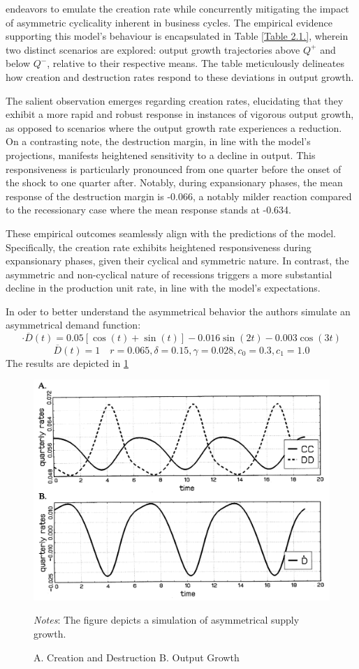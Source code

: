 \documentclass[12pt]{article}
\begin{document}
endeavors to emulate the creation rate while concurrently mitigating the impact of asymmetric cyclicality inherent in
business cycles. The empirical evidence supporting this model's behaviour is encapsulated in Table \ref{Table 2.1.},
wherein two distinct scenarios are explored: output growth trajectories above \(Q^+\) and below \(Q^-\), relative to
their respective means. The table meticulously delineates how creation and destruction rates respond to these deviations
in output growth. 
\par
The salient observation emerges regarding creation rates, elucidating that they exhibit a more rapid and robust response
in instances of vigorous output growth, as opposed to scenarios where the output growth rate experiences a reduction. On
a contrasting note, the destruction margin, in line with the model's projections, manifests heightened sensitivity to a
decline in output. This responsiveness is particularly pronounced from one quarter before the onset of the shock to one
quarter after. Notably, during expansionary phases, the mean response of the destruction margin is -0.066, a notably
milder reaction compared to the recessionary case where the mean response stands at -0.634. 
\par
These empirical outcomes seamlessly align with the predictions of the model. Specifically, the creation rate exhibits
heightened responsiveness during expansionary phases, given their cyclical and symmetric nature. In contrast, the
asymmetric and non-cyclical nature of recessions triggers a more substantial decline in the production unit rate, in
line with the model's expectations. 
\par 
In oder to better understand the asymmetrical behavior the authors simulate an asymmetrical demand function:
\[\cdot{\overline{D}}(t)=0.05[\cos(t)+\sin(t)] - 0.016 \sin(2t)-0.003\cos(3t)\]
\[\overline{D}(t)=1\quad r = 0.065, \delta =0.15, \gamma=0.028, c_0=0.3, c_1=1.0\] 
The results are depicted in \ref{plot:2.4}
\begin{figure}
    \centering
    \includegraphics[scale = 0.4]{Plot2.4.png}
    \caption{A.  Creation and  Destruction B. Output Growth}
    \label{plot:2.4}
    \footnotesize \textit{Notes}: The figure depicts a simulation of asymmetrical supply growth.
\end{figure}
\end{document}
